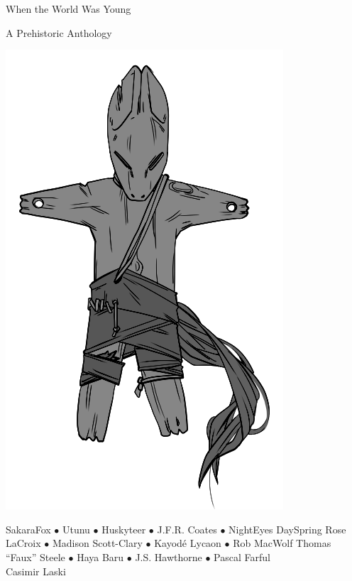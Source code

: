 \documentclass[11pt]{memoir}
\begin{document}
  \frontmatter
  \pagestyle{empty}


  \begin{flushright}
  \null
  \vfill
  \large{}
  
  \vfill
  \end{flushright}

  \cleardoublepage
  \doublespacing

  \begin{center}
    \TitleFamily
    \Huge{When the World Was Young}

    \vfill

    \large{ A Prehistoric Anthology}
    
    \vfill

    \includegraphics{assets/toy-bw.png}
    
    \vfill
  
    \normalfont\small
    SakaraFox $\bullet$
    Utunu $\bullet$
    Huskyteer $\bullet$
    J.F.R. Coates $\bullet$
    NightEyes DaySpring %
    Rose LaCroix $\bullet$
    Madison Scott-Clary $\bullet$
    Kayodé Lycaon $\bullet$
    Rob MacWolf %
    Thomas ``Faux'' Steele $\bullet$
    Haya Baru $\bullet$
    J.S. Hawthorne $\bullet$
    Pascal Farful \\%
    Casimir Laski %
  \end{center}
  \thispagestyle{empty}
\end{document}
